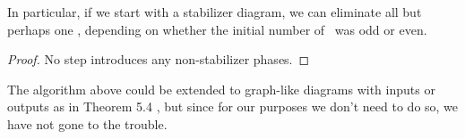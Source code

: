 \begin{corollary}\label{cor:stabilizer_simplification_algorithm_works}
	In particular, if we start with a stabilizer diagram, we can eliminate all but perhaps one \Mspider, depending on whether the initial number of \Mspiders\ was odd or even. 
	\begin{proof}
		No step introduces any non-stabilizer phases.
	\end{proof}
\end{corollary}

The algorithm above could be extended to graph-like diagrams with inputs or outputs as in Theorem 5.4 \cite{graph_theoretic_simplification}, but since for our purposes we don't need to do so, we have not gone to the trouble.
